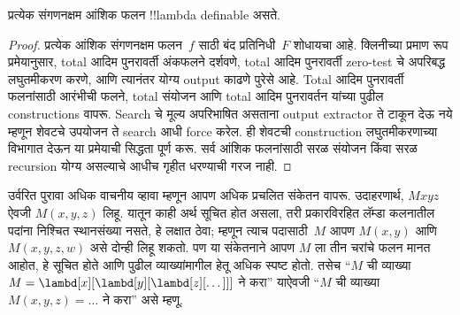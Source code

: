 \documentclass[../../../include/open-logic-section]{subfiles}
\begin{document}

\begin{thm}
प्रत्येक संगणनक्षम आंशिक फलन !!{lambda definable} असते.
\end{thm}

\begin{proof}
प्रत्येक आंशिक संगणनक्षम फलन~$f$ साठी बंद प्रतिनिधी~$F$
शोधायचा आहे. क्लिनीच्या प्रमाण रूप प्रमेयानुसार, total आदिम
पुनरावर्ती अंकफलने दर्शवणे, total आदिम पुनरावर्ती zero-test
चे अपरिबद्ध लघुतमीकरण करणे, आणि त्यानंतर योग्य output
काढणे पुरेसे आहे. Total आदिम पुनरावर्ती फलनांसाठी आरंभीची
फलने, total संयोजन आणि total आदिम पुनरावर्तन यांच्या पुढील
constructions वापरू. Search चे मूल्य अपरिभाषित असताना
output extractor ते टाकून देऊ नये म्हणून शेवटचे उपयोजन
ते search आधी force करेल. ही शेवटची construction
लघुतमीकरणाच्या विभागात देऊन या प्रमेयाची सिद्धता पूर्ण करू.
सर्व आंशिक फलनांसाठी सरळ संयोजन किंवा सरळ recursion
योग्य असल्याचे आधीच गृहीत धरण्याची गरज नाही.
\end{proof}

उर्वरित पुरावा अधिक वाचनीय व्हावा म्हणून आपण अधिक प्रचलित
संकेतन वापरू. उदाहरणार्थ, $Mxyz$ ऐवजी $M(x, y, z)$ लिहू.
यातून काही अर्थ सूचित होत असला, तरी प्रकारविरहित लॅम्डा
कलनातील पदांना निश्चित स्थानसंख्या नसते, हे लक्षात ठेवा;
म्हणून त्याच पदासाठी~$M$ आपण $M(x,y)$ आणि
$M(x,y,z,w)$ असे दोन्ही लिहू शकतो. पण या संकेतनाने
आपण $M$ ला तीन चरांचे फलन मानत आहोत, हे सूचित होते
आणि पुढील व्याख्यांमागील हेतू अधिक स्पष्ट होतो.
तसेच “$M$ ची व्याख्या $M =
\lambd[x][\lambd[y][\lambd[z][\dots]]]$ ने करा”
याऐवजी “$M$ ची व्याख्या $M(x,y,z) = \dots$ ने करा”
असे म्हणू.
\end{document}
